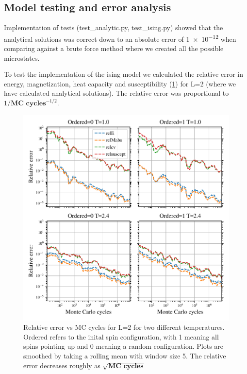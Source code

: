 \subsection{Model testing and error analysis}

Implementation of tests (test\_analytic.py, test\_ising.py) showed that the
analytical solutions was correct down to an absolute error of \num{1e-12}  when
comparing against a brute force method where we created all the possible
microstates.


To test the implementation of the ising model we calculated the relative error
in energy, magnetization, heat capacity and susceptibility (\cref{fig:error_L2})
for L=2 (where we have calculated analytical solutions). The relative error
was proportional to $1/ \textbf{MC cycles}^{-1/2}$.

\begin{figure}[H]
  \centering
  \includegraphics[width=\textwidth]{../figures/relative_error.pdf}
  \caption{Relative error vs MC cycles for L=2 for two different temperatures. Ordered
  refers to the inital spin configuration, with 1 meaning all spins pointing up and
  0 meaning a random configuration. Plots are smoothed by taking a
  rolling mean with window size 5. The relative error decreases roughly as
  $\sqrt{\textbf{MC cycles}}$}
  \label{fig:error_L2}
\end{figure}


